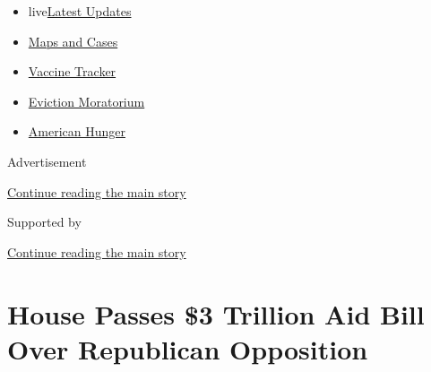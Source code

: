 \begin{itemize}
\tightlist
\item
  live\href{https://www.nytimes3xbfgragh.onion/2020/09/05/world/coronavirus-covid.html?name=styln-coronavirus-national\&region=TOP_BANNER\&block=storyline_menu_recirc\&action=click\&pgtype=Article\&impression_id=90a02a81-efbb-11ea-bdea-9bf7354ffa7c\&variant=undefined}{Latest
  Updates}
\item
  \href{https://www.nytimes3xbfgragh.onion/interactive/2020/us/coronavirus-us-cases.html?name=styln-coronavirus-national\&region=TOP_BANNER\&block=storyline_menu_recirc\&action=click\&pgtype=Article\&impression_id=90a05190-efbb-11ea-bdea-9bf7354ffa7c\&variant=undefined}{Maps
  and Cases}
\item
  \href{https://www.nytimes3xbfgragh.onion/interactive/2020/science/coronavirus-vaccine-tracker.html?name=styln-coronavirus-national\&region=TOP_BANNER\&block=storyline_menu_recirc\&action=click\&pgtype=Article\&impression_id=90a05191-efbb-11ea-bdea-9bf7354ffa7c\&variant=undefined}{Vaccine
  Tracker}
\item
  \href{https://www.nytimes3xbfgragh.onion/2020/09/02/your-money/eviction-moratorium-covid.html?name=styln-coronavirus-national\&region=TOP_BANNER\&block=storyline_menu_recirc\&action=click\&pgtype=Article\&impression_id=90a05192-efbb-11ea-bdea-9bf7354ffa7c\&variant=undefined}{Eviction
  Moratorium}
\item
  \href{https://www.nytimes3xbfgragh.onion/interactive/2020/09/02/magazine/food-insecurity-hunger-us.html?name=styln-coronavirus-national\&region=TOP_BANNER\&block=storyline_menu_recirc\&action=click\&pgtype=Article\&impression_id=90a05193-efbb-11ea-bdea-9bf7354ffa7c\&variant=undefined}{American
  Hunger}
\end{itemize}

Advertisement

\protect\hyperlink{after-top}{Continue reading the main story}

Supported by

\protect\hyperlink{after-sponsor}{Continue reading the main story}

\hypertarget{house-passes-3-trillion-aid-bill-over-republican-opposition}{%
\section{House Passes \$3 Trillion Aid Bill Over Republican
Opposition}\label{house-passes-3-trillion-aid-bill-over-republican-opposition}}

